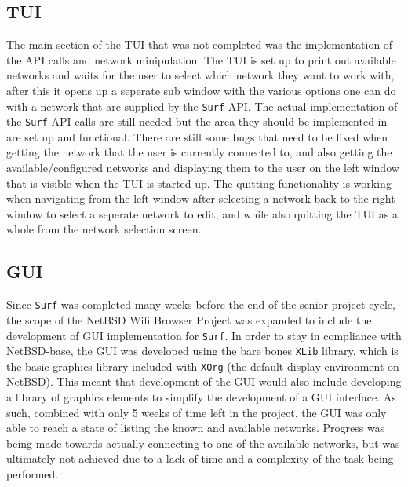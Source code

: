 \documentclass[11pt]{article}
\begin{document}
\subsection*{TUI}
The main section of the TUI that was not completed was the implementation of the API calls 
and network minipulation. The TUI is set up to print out available networks and waits for the user
to select which network they want to work with, after this it opens up a seperate sub window with
the various options one can do with a network that are supplied by the \texttt{Surf} API. The actual
implementation of the \texttt{Surf} API calls are still needed but the area they should be implemented
in are set up and functional. There are still some bugs that need to be fixed when getting the network 
that the user is currently connected to, and also getting the available/configured networks and displaying 
them to the user on the left window that is visible when the TUI is started up. The quitting functionality 
is working when navigating from the left window after selecting a network back to the right window to select 
a seperate network to edit, and while also quitting the TUI as a whole from the network selection screen.

\subsection*{GUI}
Since \texttt{Surf} was completed many weeks before the end of the senior project cycle,
the scope of the NetBSD Wifi Browser Project was expanded to include the development of 
GUI implementation for \texttt{Surf}.
In order to stay in compliance with NetBSD-base, the GUI was developed using the bare bones
\texttt{XLib} library, which is the basic graphics library included with \texttt{XOrg} 
(the default display environment on NetBSD).
This meant that development of the GUI would also include developing a library of graphics
elements to simplify the development of a GUI interface.
As such, combined with only 5 weeks of time left in the project, the GUI was only able
to reach a state of listing the known and available networks.
Progress was being made towards actually connecting to one of the available networks,
but was ultimately not achieved due to a lack of time and a complexity of the task
being performed.
\end{document}
